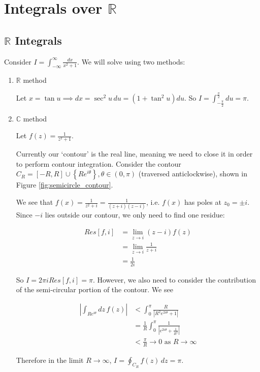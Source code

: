 \documentclass{../../physics_notes}
\begin{document}
\section{Integrals over $\mathbb{R}$}

\subsection{$\mathbb{R}$ Integrals }

Consider $I = \int_{-\infty}^\infty \frac{dx}{x^2 + 1}$. We will solve using two methods:

\begin{enumerate}[label=\alph*)]
	\item{
		$\mathbb{R}$ method \newline

		Let $x = \tan{u} \implies dx = \sec^2{u}\, du = (1+\tan^2{u})du$. So $I = \int_{-\frac{\pi}{2}}^{\frac{\pi}{2}} du = \pi $.
	}

	\item{
		$\mathbb{C}$ method \newline

		Let $f(z) = \frac{1}{z^2 + 1}$.

		Currently our `contour' is the real line, meaning we need to close it in order to perform contour integration. Consider the contour $C_R = [-R, R]\cup \left\{Re^{i\theta}\right\}, \theta \in (0,\pi)$ (traversed anticlockwise), shown in Figure \ref{fig:semicircle_contour}.

		We see that $f(x) = \frac{1}{z^2 + i} = \frac{1}{(z+i)(z-i)}$, i.e. $f(x)$ has poles at $z_0 = \pm i$. Since $-i$ lies outside our contour, we only need to find one residue:

		\begin{align*}
			Res[f,i] &= \lim_{z\to i} (z - i)f(z) \\
			&= \lim_{z\to i} \frac{1}{z + i} \\
			&= \frac{1}{2i}
		\end{align*}

		So $I = 2\pi i Res[f,i] = \pi$. However, we also need to consider the contribution of the semi-circular portion of the contour. We see

		\begin{align*}
			\left|\int_{Re^{i\theta}} dz\, f(z)\right| &< \int_0^{\pi} \frac{R}{|R^2 e^{2i\theta} + 1|} \\
			&= \frac{1}{R}\int_0^{\pi} \frac{1}{|e^{2i\theta} + \frac{1}{R^2}|} \\
			&< \frac{\pi}{R} \to 0 \text{ as } R \to \infty 
		\end{align*}

		Therefore in the limit $R\to\infty$, $I = \oint_{C_R} f(z)\, dz = \pi$. 
	}
\end{enumerate}
\end{document}
